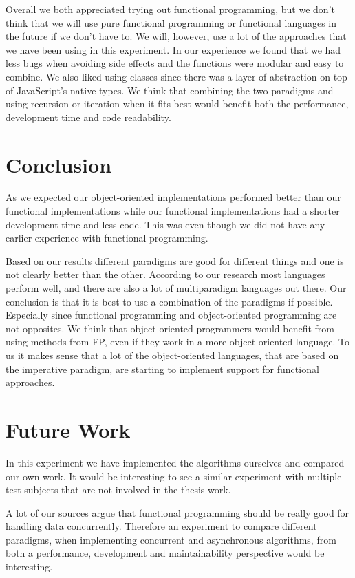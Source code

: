 \documentclass {article}
\begin{document}
Overall we both appreciated trying out functional programming, but we don't think that we will use pure functional programming or functional languages in the future if we don't have to. We will, however, use a lot of the approaches that we have been using in this experiment. In our experience we found that we had less bugs when avoiding side effects and the functions were modular and easy to combine. We also liked using classes since there was a layer of abstraction on top of JavaScript's native types. We think that combining the two paradigms and using recursion or iteration when it fits best would benefit both the performance, development time and code readability. 
\section{Conclusion}
As we expected our object-oriented implementations performed better than our functional implementations while our functional implementations had a shorter development time and less code. This was even though we did not have any earlier experience with functional programming.  

Based on our results different paradigms are good for different things and one is not clearly better than the other. According to our research most languages perform well, and there are also a lot of multiparadigm languages out there. Our conclusion is that it is best to use a combination of the paradigms if possible. Especially since functional programming and object-oriented programming are not opposites. We think that object-oriented programmers would benefit from using methods from FP, even if they work in a more object-oriented language. To us it makes sense that a lot of the object-oriented languages, that are based on the imperative paradigm, are starting to implement support for functional approaches.

\section{Future Work}
In this experiment we have implemented the algorithms ourselves and compared our own work. It would be interesting to see a similar experiment with multiple test subjects that are not involved in the thesis work. 

A lot of our sources argue that functional programming should be really good for handling data concurrently. Therefore an experiment to compare different paradigms,  when implementing concurrent and asynchronous algorithms, from both a performance, development and maintainability perspective would be interesting. 
\end{document}
